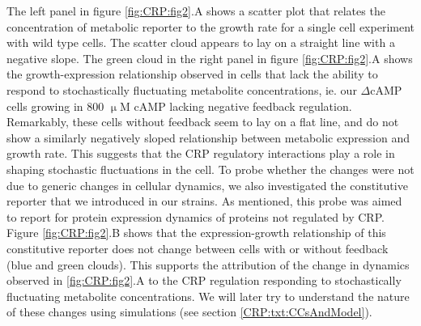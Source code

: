 %
The left panel in figure \ref{fig:CRP:fig2}.A shows a scatter plot that relates the concentration of metabolic reporter to the growth rate for a single cell experiment with wild type cells.
%
%
The scatter cloud appears to lay on a straight line with a negative slope.
%
The green cloud in the right panel in figure \ref{fig:CRP:fig2}.A shows
the growth-expression relationship observed in cells 
that lack the ability to respond to stochastically fluctuating metabolite concentrations, ie. our $\Delta$cAMP cells growing in 800 $\upmu$M cAMP lacking negative feedback regulation.
%
Remarkably, these cells without feedback 
seem to lay on a flat line, and
do not show a similarly negatively sloped relationship between metabolic expression and growth rate.
%
This suggests that the CRP regulatory interactions play a role in shaping stochastic fluctuations in the cell. 
%
To probe whether 
the changes 
were not due to generic changes in cellular dynamics, 
we also investigated the constitutive reporter that we introduced in our strains. 
%
%
%
As mentioned, this probe was aimed to report for protein expression dynamics of proteins not regulated by CRP.
%
Figure \ref{fig:CRP:fig2}.B shows that the expression-growth relationship of this constitutive reporter does not change between cells with or without feedback (blue and green clouds).
This supports the attribution of the change in dynamics observed in \ref{fig:CRP:fig2}.A to the CRP regulation responding to stochastically fluctuating metabolite concentrations.
%
We will later try to understand the nature of these changes using simulations (see section \ref{CRP:txt:CCsAndModel}).

